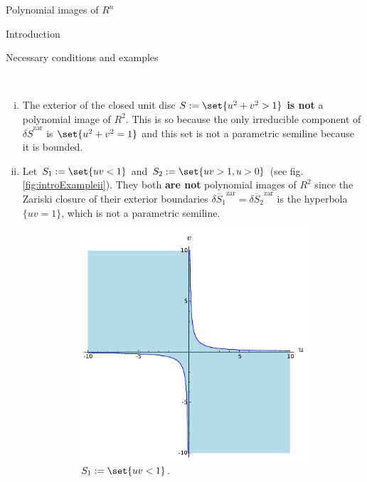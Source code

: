 \documentclass[11pt, a4paper, english, twoside, notitlepage, openright]{report}
\begin{document}
\begin{chapter}{Polynomial images of $R^n$}
\begin{section}{Introduction}
\begin{subsection}{Necessary conditions and examples}
\begin{examples}\label{introExample}
\
\begin{enumerate}[(i)]
\item The exterior of the closed unit disc $S:=\set{u^2+v^2>1}$ \textbf{is not} a polynomial image of $R^2$. This is so because the only irreducible component of $\overline{\delta S}^{\text{zar}}$ is $\set{u^2+v^2=1}$ and this set is not a parametric semiline because it is bounded.
			
\item Let $S_1:=\set{uv<1}$ and $S_2:=\set{uv>1,u>0}$ (see fig. \ref{fig:introExampleii}). They both \textbf{are not} polynomial images of $R^2$ since the Zariski closure of their exterior boundaries $\overline{\delta S_1}^{\text{zar}}=\overline{\delta S_2}^{\text{zar}}$ is the hyperbola $\{uv=1\}$, which is not a parametric semiline.
\begin{figure}[h]\hspace{-0.5cm}
\begin{subfigure}{.55\linewidth}\centering
\includegraphics[width=1\textwidth]{plots/ch1_01_S_1.pdf}
\caption{$S_1:=\set{uv<1}$.\label{fig:S_1}}
\end{subfigure}
\begin{subfigure}{.55\linewidth}\centering

\end{subfigure}
\end{figure}
\end{enumerate}
\end{examples}
\end{subsection}
\end{section}
\end{chapter}
\end{document}
